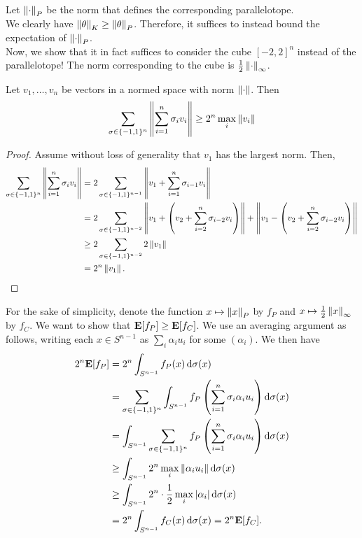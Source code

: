 Let $\left\lVert\cdot\right\rVert_P$ be the norm that defines the corresponding parallelotope.\\
We clearly have $\left\lVert\theta\right\rVert_K\geq\left\lVert\theta\right\rVert_P$.
Therefore, it suffices to instead bound the expectation of $\left\lVert\cdot\right\rVert_P$.\\

Now, we show that it in fact suffices to consider the cube $[-2,2]^n$ instead of the parallelotope! The norm corresponding to the cube is $\frac{1}{2}\left\lVert\cdot\right\rVert_\infty$.

\begin{lemma}
Let $v_1,\ldots,v_n$ be vectors in a normed space with norm $\left\lVert\cdot\right\rVert$. Then
\[ \sum_{\sigma\in\{-1,1\}^n}\left\lVert\sum_{i=1}^n \sigma_i v_i\right\rVert \geq 2^n\max_i \left\lVert v_i\right\rVert \]
\end{lemma}
\begin{proof}
Assume without loss of generality that $v_1$ has the largest norm. Then,
\begin{align*}
    \sum_{\sigma\in\{-1,1\}^n}\left\lVert\sum_{i=1}^n \sigma_i v_i\right\rVert &= 2 \sum_{\sigma\in\{-1,1\}^{n-1}}\left\lVert v_1 + \sum_{i=1}^n \sigma_{i-1} v_i\right\rVert \\
    &= 2 \sum_{\sigma\in\{-1,1\}^{n-2}}\left\lVert v_1 + \left( v_2 + \sum_{i=2}^n \sigma_{i-2} v_i\right)\right\rVert + \left\lVert v_1 - \left( v_2 + \sum_{i=2}^n \sigma_{i-2} v_i\right)\right\rVert \\
    &\geq 2\sum_{\sigma\in\{-1,1\}^{n-2}} 2\left\lVert v_1\right\rVert \\
    &= 2^n\left\lVert v_1\right\rVert.
\end{align*}
\end{proof}


For the sake of simplicity, denote the function $x\mapsto\left\lVert x\right\rVert_P$ by $f_P$ and $x\mapsto\frac{1}{2}\left\lVert x\right\rVert_\infty$ by $f_C$. We want to show that $\textbf{E}[f_P]\geq\textbf{E}[f_C]$. We use an averaging argument as follows, writing each $x\in S^{n-1}$ as $\sum_i \alpha_i u_i$ for some $(\alpha_i)$. We then have
\begin{align*}
    2^n \textbf{E}[f_P] &= 2^n \int_{S^{n-1}} f_P(x)\operatorname{d}\!{\sigma}(x) \\
    &= \sum_{\sigma\in\{-1,1\}^n} \int_{S^{n-1}} f_P\left(\sum_{i=1}^n \sigma_i\alpha_i u_i\right) \operatorname{d}\!{\sigma}(x) \\
    &= \int_{S^{n-1}} \sum_{\sigma\in\{-1,1\}^n} f_P\left(\sum_{i=1}^n \sigma_i\alpha_i u_i\right) \operatorname{d}\!{\sigma}(x) \\
    &\geq \int_{S^{n-1}} 2^n \max_i\left\lVert\alpha_i u_i\right\rVert \operatorname{d}\!{\sigma}(x) \\
    &\geq \int_{S^{n-1}} 2^n\cdot\frac{1}{2}\max_i|\alpha_i| \operatorname{d}\!{\sigma}(x) \\
    &= 2^n \int_{S^{n-1}} f_C(x)\operatorname{d}\!{\sigma}(x) = 2^n \textbf{E}[f_C].
\end{align*}

